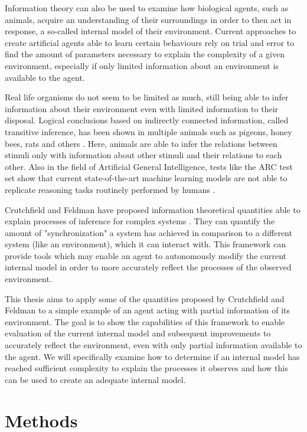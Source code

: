 \documentclass[12pt,a4paper]{article}
\begin{document}
Information theory can also be used to examine how biological agents, such as animals, acquire an understanding of their surroundings in order to then act in response, a so-called internal model of their environment.
Current approaches to create artificial agents able to learn certain behaviours rely on trial and error to find the amount of parameters necessary to explain the complexity of a given environment, especially if only limited information about an environment is available to the agent.

Real life organisms do not seem to be limited as much, still being able to infer information about their environment even with limited information to their disposal.
Logical conclusions based on indirectly connected information, called transitive inference, has been shown in multiple animals such as pigeons, honey bees, rats and others \autocite{vasconcelos2008transitive}.
Here, animals are able to infer the relations between stimuli only with information about other stimuli and their relations to each other.
Also in the field of Artificial General Intelligence, tests like the ARC test set \autocite{chollet2019measure} show that current state-of-the-art machine learning models are not able to replicate reasoning tasks routinely performed by humans \autocite{johnson2021fast}.

Crutchfield and Feldman have proposed information theoretical quantities able to explain processes of inference for complex systems \autocite{crutchfield2003regularities}.
They can quantify the amount of "synchronization" a system has achieved in comparison to a different system (like an environment), which it can interact with.
This framework can provide tools which may enable an agent to autonomously modify the current internal model in order to more accurately reflect the processes of the observed environment.

This thesis aims to apply some of the quantities proposed by Crutchfield and Feldman to a simple example of an agent acting with partial information of its environment.
The goal is to show the capabilities of this framework to enable evaluation of the current internal model and subsequent improvements to accurately reflect the environment, even with only partial information available to the agent.
We will specifically examine how to determine if an internal model has reached sufficient complexity to explain the processes it observes and how this can be used to create an adequate internal model.

\newpage
\section{Methods} \label{sec:methods}
\end{document}
